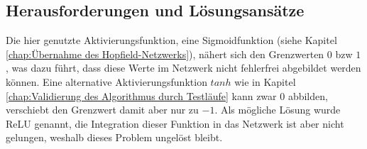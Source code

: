 \subsection{Herausforderungen und Lösungsansätze}

Die hier genutzte Aktivierungsfunktion, eine Sigmoidfunktion (siehe Kapitel \ref{chap:Übernahme des Hopfield-Netzwerks}), nähert sich den Grenzwerten \(0\) bzw \(1\), was dazu führt, dass diese Werte im Netzwerk nicht fehlerfrei abgebildet werden können. Eine alternative Aktivierungsfunktion \(tanh\) wie in Kapitel \ref{chap:Validierung des Algorithmus durch Testläufe} kann zwar \(0\) abbilden, verschiebt den Grenzwert damit aber nur zu \(-1\). Als mögliche Lösung wurde ReLU genannt, die Integration dieser Funktion in das Netzwerk ist aber nicht gelungen, weshalb dieses Problem ungelöst bleibt.

